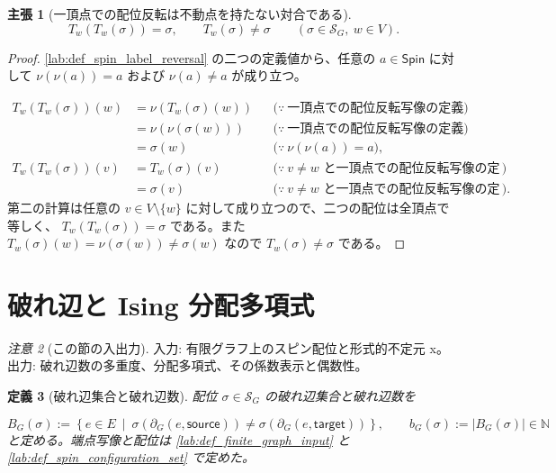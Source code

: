 \documentclass[11pt,a4paper]{article}
\newtheorem{definition}{定義}[section]
\newtheorem{claim}[definition]{主張}
\theoremstyle{remark}
\newtheorem{remark}[definition]{注意}
\begin{document}
\begin{claim}[一頂点での配位反転は不動点を持たない対合である]\label{lab:claim_single_vertex_spin_flip_involution}
\[T_w(T_w(\sigma))=\sigma,\qquad T_w(\sigma)\ne\sigma
\qquad(\sigma\in\mathcal S_G,\ w\in V).\]
\end{claim}
\begin{proof}
\cref{lab:def_spin_label_reversal}
 の二つの定義値から、任意の 
$a\in\mathsf{Spin}$
 に対して 
$\nu(\nu(a))=a$
 および 
$\nu(a)\ne a$
 が成り立つ。

\[\begin{aligned}
T_w(T_w(\sigma))(w)
&=\nu(T_w(\sigma)(w))
&&\bigl(\because\ \text{一頂点での配位反転写像の定義}\bigr)\\
&=\nu(\nu(\sigma(w)))
&&\bigl(\because\ \text{一頂点での配位反転写像の定義}\bigr)\\
&=\sigma(w)
&&\bigl(\because\ \nu(\nu(a))=a\bigr),\\[4pt]
T_w(T_w(\sigma))(v)
&=T_w(\sigma)(v)
&&\bigl(\because\ v\ne w\text{ と一頂点での配位反転写像の定義}\bigr)\\
&=\sigma(v)
&&\bigl(\because\ v\ne w\text{ と一頂点での配位反転写像の定義}\bigr).
\end{aligned}\]
第二の計算は任意の 
$v\in V\setminus\{w\}$
 に対して成り立つので、二つの配位は全頂点で等しく、
$T_w(T_w(\sigma))=\sigma$
 である。また 
$T_w(\sigma)(w)=\nu(\sigma(w))\ne\sigma(w)$
 なので 
$T_w(\sigma)\ne\sigma$
 である。

\end{proof}

\section{破れ辺と Ising 分配多項式}

\begin{remark}[この節の入出力]
入力: 有限グラフ上のスピン配位と形式的不定元 x。出力: 破れ辺数の多重度、分配多項式、その係数表示と偶数性。

\end{remark}

\begin{definition}[破れ辺集合と破れ辺数]\label{lab:def_broken_edge_set}
配位 
$\sigma\in\mathcal S_G$
 の破れ辺集合と破れ辺数を

\[B_G(\sigma):=\left\{e\in E\ \middle|\ \sigma\!\left(\partial_G(e,\mathsf{source})\right)\ne\sigma\!\left(\partial_G(e,\mathsf{target})\right)\right\},\qquad b_G(\sigma):=|B_G(\sigma)|\in\mathbb N\]
と定める。端点写像と配位は 
\cref{lab:def_finite_graph_input}
 と 
\cref{lab:def_spin_configuration_set}
 で定めた。

\end{definition}
\end{document}
